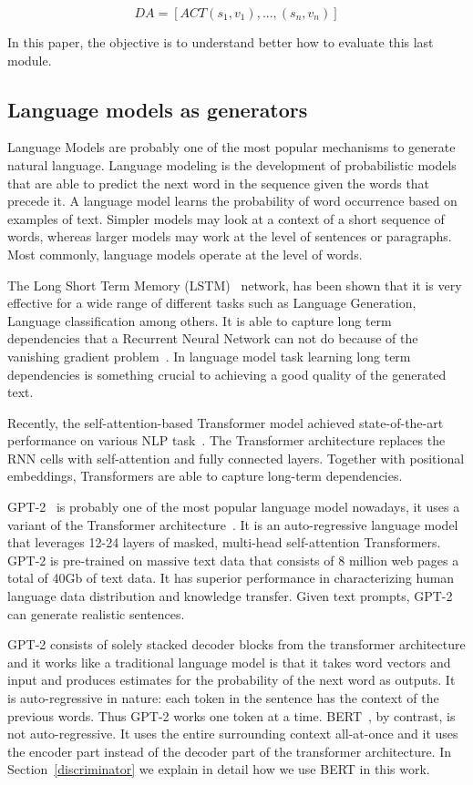 \documentclass[11pt]{article}
\begin{document}
$$ DA = [ACT{(s_{1},v_{1}), ... ,(s_{n},v_{n})}] $$

In this paper, the objective is to understand better how to evaluate this last module.


\subsection{Language models as generators} \label{language_model}
Language Models are probably one of the most popular mechanisms to generate natural language. Language modeling is the development of probabilistic models that are able to predict the next word in the sequence given the words that precede it.
A language model learns the probability of word occurrence based on examples of text. Simpler models may look at a context of a short sequence of words, whereas larger models may work at the level of sentences or paragraphs. Most commonly, language models operate at the level of words.

The Long Short Term Memory (LSTM)~\cite{hochreiter1997long} network, has been shown that it is very effective for a wide range of different tasks such as Language Generation, Language classification among others. It is able to capture long term dependencies that a Recurrent Neural Network can not do because of the vanishing gradient problem~\cite{bengio1994learning}. In language model task learning long term dependencies is something crucial to achieving a good quality of the generated text.

Recently, the self-attention-based Transformer model achieved state-of-the-art performance on various NLP task~\cite{vaswani2017attention}. The Transformer architecture replaces the RNN cells with self-attention and fully connected layers. Together with positional embeddings, Transformers are able to capture long-term dependencies.

GPT-2~\cite{radford2019language} is probably one of the most popular language model nowadays, it uses a variant of the Transformer  architecture~\cite{vaswani2017attention}. It is an auto-regressive language model that leverages 12-24 layers of masked, multi-head self-attention Transformers. GPT-2 is pre-trained on massive text data that consists of 8 million web pages a total of 40Gb of text data. It has superior performance in characterizing human language data distribution and knowledge transfer. Given text prompts, GPT-2 can generate realistic sentences.

GPT-2 consists of solely stacked decoder blocks from the transformer architecture and it works like a traditional language model is that it takes word vectors and input and produces estimates for the probability of the next word as outputs. It is auto-regressive in nature: each token in the sentence has the context of the previous words. Thus GPT-2 works one token at a time. BERT~\cite{devlin2018bert}, by contrast, is not auto-regressive. It uses the entire surrounding context all-at-once and it uses the encoder part instead of the decoder part of the transformer architecture. In Section~\ref{discriminator} we explain in detail how we use BERT in this work.
\end{document}
